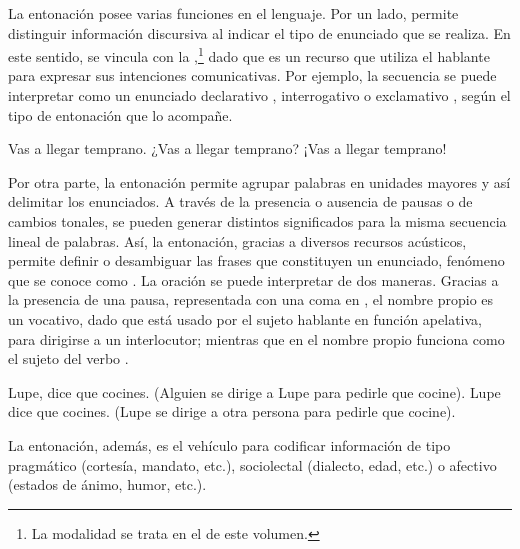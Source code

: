 La entonación posee varias funciones en el lenguaje. Por un lado, permite
distinguir información discursiva al indicar el tipo de enunciado que se
realiza. En este sentido, se vincula con la ,\footnote{La
modalidad se trata en el  de este volumen.} dado que es un recurso
que utiliza el hablante para expresar sus intenciones comunicativas. Por
ejemplo, la secuencia  se puede interpretar como un
enunciado declarativo , interrogativo
 o exclamativo , según el tipo
de entonación que lo acompañe.

\begin{exe}
  \ex\label{ex:03-modalidad}
    \begin{xlist}
      \ex\label{ex:03-modalidad-a} Vas a llegar temprano.
      \ex\label{ex:03-modalidad-b} ¿Vas a llegar temprano?
      \ex\label{ex:03-modalidad-c} ¡Vas a llegar temprano!
    \end{xlist}
\end{exe}

Por otra parte, la entonación permite agrupar palabras en unidades mayores y así
delimitar los enunciados. A través de la presencia o ausencia de pausas o de
cambios tonales, se pueden generar distintos significados para la misma
secuencia lineal de palabras. Así, la entonación, gracias a diversos recursos
acústicos, permite definir o desambiguar las frases que constituyen un
enunciado, fenómeno que se conoce como . La oración  se puede interpretar de dos maneras. Gracias a la presencia de
una pausa, representada con una coma en , el nombre propio
es un vocativo, dado que está usado por el sujeto hablante en función
apelativa, para dirigirse a un interlocutor; mientras que en
 el nombre propio funciona como el sujeto del verbo
.

\begin{exe}
  \ex\label{ex:03-lupe}
    \begin{xlist}
      \ex\label{ex:03-lupe-a} Lupe, dice que cocines. (Alguien se dirige a Lupe
          para pedirle que cocine).
      \ex\label{ex:03-lupe-b} Lupe dice que cocines. (Lupe se dirige a otra
          persona para pedirle que cocine).
    \end{xlist}
\end{exe}

La entonación, además, es el vehículo para codificar información de tipo
pragmático (cortesía, mandato, etc.), sociolectal (dialecto, edad, etc.) o
afectivo (estados de ánimo, humor, etc.).

